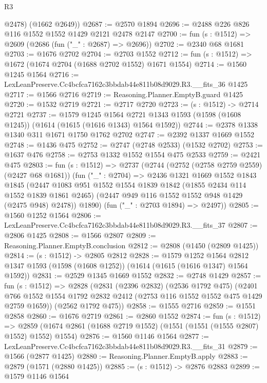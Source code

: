 \begin{lexlean}{R3}
\begin{coremodule}
        @2478)
      (@1662 @2649))
@2687 := @2570 @1894
@2696 := @2488 @226 @826 @116 @1552 @1552 @1429 @2121 @2478 @2147
@2700 := fun (s : @1512) => @2609 (@2686 (fun ("_" : @2687) => @2696))
@2702 := @2340 @68 @1681
@2703 := @1676 @2702
@2704 := @2703 @1552
@2712 := fun (s : @1512) => @1672 (@1674 @2704 (@1688 @2702 @1552) @1671 @1554)
@2714 := @1560 @1245 @1564
@2716 := LexLeanPreserve.Cc4bcfca7162c3bbdab44e811b08d9029.R3.__fits_36 @1425
@2717 := @1566 @2716
@2719 := Reasoning.Planner.EmptyB.guard @1425
@2720 := @1532 @2719
@2721 := @2717 @2720
@2723 := (s : @1512) -> @2714 @2721
@2737 := @1579
    @1245
    @1564
    @2721
    @1343
    @1593
    (@1598 (@1608 @1245))
    (@1614 (@1615 (@1616 @1343) @1564 @1592))
@2744 := @2378 @1338 @1340 @311 @1671 @1750 @1762 @2702
@2747 := @2392 @1337 @1669 @1552
@2748 := @1436 @475
@2752 := @2747 (@2748 @2533) (@1532 @2702)
@2753 := @1637 @476
@2758 := @2753 @1332 @1552 @1554 @475 @2533
@2759 := @2421 @475
@2803 := fun (s : @1512) =>
  @2737
    (@2744
      (@2752 (@2758 @2759 @2559) (@2427 @68 @1681))
      (fun ("_" : @2704) =>
      @2436
        @1321
        @1669
        @1552
        @1843
        @1845
        (@2447
          @1083
          @951
          @1552
          @1554
          @1839
          @1842
          (@1855 @2434 @114 @1552 @1839 @1861 @2465)
          (@2447 @949 @116 @1552 @1552 @948 @1429 (@2475 @948) @2478))
        @1890)
      (fun ("_" : @2703 @1894) => @2497))
@2805 := @1560 @1252 @1564
@2806 := LexLeanPreserve.Cc4bcfca7162c3bbdab44e811b08d9029.R3.__fits_37
@2807 := @2806 @1425
@2808 := @1566 @2807
@2809 := Reasoning.Planner.EmptyB.conclusion
@2812 := @2808 (@1450 (@2809 @1425))
@2814 := (s : @1512) -> @2805 @2812
@2828 := @1579
    @1252
    @1564
    @2812
    @1347
    @1593
    (@1598 (@1608 @1252))
    (@1614 (@1615 (@1616 @1347) @1564 @1592))
@2831 := @2529 @1345 @1669 @1552
@2832 := @2748 @1429
@2857 := fun (s : @1512) =>
  @2828
    (@2831
      (@2396 @2832)
      (@2536 @1792 @475)
      (@2401 @766 @1552 @1554 @1792 @2832 @2412 (@2753 @116 @1552 @1552 @475 @1429 @2759 @1659))
      (@2562 @1792 @475))
@2858 := @1555 @2716
@2859 := @1551 @2858
@2860 := @1676 @2719
@2861 := @2860 @1552
@2874 := fun (s : @1512) =>
  @2859 (@1674 @2861 (@1688 @2719 @1552) (@1551 (@1551 (@1555 @2807) @1552) @1552) @1554)
@2876 := @1560 @1146 @1564
@2877 := LexLeanPreserve.Cc4bcfca7162c3bbdab44e811b08d9029.R3.__fits_31
@2879 := @1566 (@2877 @1425)
@2880 := Reasoning.Planner.EmptyB.apply
@2883 := @2879 (@1571 (@2880 @1425))
@2885 := (s : @1512) -> @2876 @2883
@2899 := @1579
    @1146
    @1564

\end{coremodule}
\end{lexlean}
